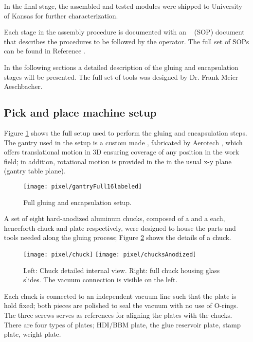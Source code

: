 In the final stage, the assembled and tested modules were shipped to University of Kansas for further characterization.  

Each stage in the assembly procedure is documented with an ~ (SOP) document that describes the procedures to be followed by the operator. The full set of SOPs can be found in Reference \cite{unl_sop}.     

In the following sections a detailed description of the gluing and encapsulation stages will be presented. The full set of tools was designed by Dr. Frank Meier Aeschbacher. 

\subsection{Pick and place machine setup}

Figure \ref{fig:setup} shows the full setup used to perform the gluing and encapsulation steps. The gantry used in the setup is a custom made , fabricated by Aerotech \cite{aerotech}, which offers translational motion in 3D ensuring coverage of any position in the work field; in addition, rotational motion is provided in the  in the usual x-y plane (gantry table plane).

\begin{figure}[!h]
  \centering
  \texttt{[image: pixel/gantryFull16labeled]}
  \caption[Full gluing and encapsulation setup]{Full gluing and encapsulation setup. }\label{fig:setup}
\end{figure}

A set of eight hard-anodized aluminum chucks, composed of a  and a  each, henceforth chuck and plate respectively, were designed to house the parts and tools needed along the gluing process; Figure \ref{fig:chuck} shows the details of a chuck.      

\begin{figure}[!h]
  \centering
  \texttt{[image: pixel/chuck]}
  \texttt{[image: pixel/chucksAnodized]}
  \caption[Bare and full chucks]{Left: Chuck detailed internal view. Right: full chuck housing glass slides. The vacuum connection is visible on the left.}\label{fig:chuck}
\end{figure}

Each chuck is connected to an independent vacuum line such that the plate is hold fixed; both pieces are polished to seal the vacuum with no use of O-rings. The three screws serves as references for aligning the plates with the chucks. There are four types of plates; HDI/BBM plate, the glue reservoir plate, stamp plate, weight plate.

